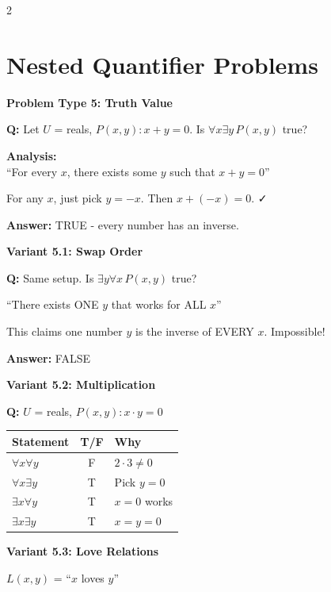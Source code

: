 \documentclass[8pt,a4paper]{article}
\newenvironment{exbox}[1][]{\vspace{2pt}\noindent\textbf{#1}\par\smallskip}{\vspace{2pt}}
\begin{document}
\begin{multicols}{2}

\section{Nested Quantifier Problems}

\begin{exbox}[Problem Type 5: Truth Value]
\textbf{Q:} Let $U$ = reals, $P(x,y): x + y = 0$. Is $\forall x \exists y\, P(x,y)$ true?

\textbf{Analysis:}\\
``For every $x$, there exists some $y$ such that $x + y = 0$''

For any $x$, just pick $y = -x$. Then $x + (-x) = 0$. ✓

\textbf{Answer:} TRUE - every number has an inverse.
\end{exbox}

\begin{exbox}[Variant 5.1: Swap Order]
\textbf{Q:} Same setup. Is $\exists y \forall x\, P(x,y)$ true?

``There exists ONE $y$ that works for ALL $x$''

This claims one number $y$ is the inverse of EVERY $x$. Impossible!

\textbf{Answer:} FALSE
\end{exbox}

\begin{exbox}[Variant 5.2: Multiplication]
\textbf{Q:} $U$ = reals, $P(x,y): x \cdot y = 0$

\begin{center}
\scriptsize
\begin{tabular}{l|c|l}
Statement & T/F & Why \\
\hline
$\forall x \forall y$ & F & $2 \cdot 3 \neq 0$ \\
$\forall x \exists y$ & T & Pick $y=0$ \\
$\exists x \forall y$ & T & $x=0$ works \\
$\exists x \exists y$ & T & $x=y=0$ \\
\end{tabular}
\end{center}
\end{exbox}

\begin{exbox}[Variant 5.3: Love Relations]
$L(x,y)$ = ``$x$ loves $y$''


\end{exbox}
\end{multicols}
\end{document}
